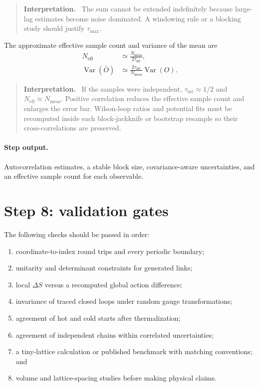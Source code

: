 \documentclass[11pt]{article}
\newcommand{\Nmeas}{N_{\mathrm{meas}}}
\newenvironment{interpretation}
  {\begin{quote}\small\noindent\textbf{Interpretation.}\ }
  {\end{quote}}
\begin{document}
\begin{interpretation}
The sum cannot be extended indefinitely because large-lag estimates become
noise dominated. A windowing rule or a blocking study should justify
\(\tau_{\max}\).
\end{interpretation}

The approximate effective sample count and variance of the mean are
\begin{align}
  N_{\mathrm{eff}}
  &\simeq\frac{\Nmeas}{2\tau_{\mathrm{int}}},
  \label{eq:effective-samples}\\
  \operatorname{Var}(\bar O)
  &\simeq
  \frac{2\tau_{\mathrm{int}}}{\Nmeas}
  \operatorname{Var}(O).
  \label{eq:correlated-variance}
\end{align}

\begin{interpretation}
If the samples were independent, \(\tau_{\mathrm{int}}\approx1/2\) and
\(N_{\mathrm{eff}}\approx\Nmeas\). Positive correlation reduces the effective
sample count and enlarges the error bar. Wilson-loop ratios and potential fits
must be recomputed inside each block-jackknife or bootstrap resample so their
cross-correlations are preserved.
\end{interpretation}

\paragraph{Step output.}
Autocorrelation estimates, a stable block size, covariance-aware uncertainties,
and an effective sample count for each observable.

\section{Step 8: validation gates}

The following checks should be passed in order:

\begin{enumerate}
  \item coordinate-to-index round trips and every periodic boundary;
  \item unitarity and determinant constraints for generated links;
  \item local \(\Delta S\) versus a recomputed global action difference;
  \item invariance of traced closed loops under random gauge transformations;
  \item agreement of hot and cold starts after thermalization;
  \item agreement of independent chains within correlated uncertainties;
  \item a tiny-lattice calculation or published benchmark with matching
        conventions; and
  \item volume and lattice-spacing studies before making physical claims.
\end{enumerate}
\end{document}
